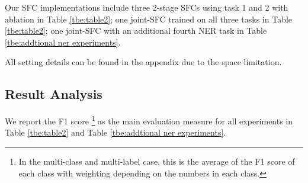 Our SFC implementations include three 2-stage SFCs using task 1 and 2 with ablation in Table \ref{tbe:table2}; one joint-SFC trained on all three tasks in Table \ref{tbe:table2}; one joint-SFC with an additional fourth NER task in Table \ref{tbe:addtional ner experiments}. 

All setting details can be found in the appendix due to the space limitation.

\subsection{Result Analysis}
We report the F1 score \footnote{In the multi-class and multi-label case, this
is the average of the F1 score of each class with weighting depending on the
numbers in each class.} as the main evaluation measure for all experiments in
Table \ref{tbe:table2} and Table \ref{tbe:addtional ner experiments}.

